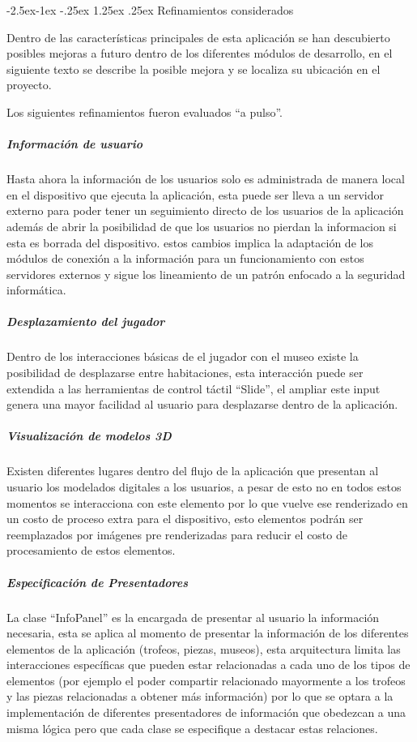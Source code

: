 \documentclass[12pt]{article}
\makeatletter
\renewcommand\paragraph{\@startsection{paragraph}{4}{\z@}%
	{-2.5ex\@plus -1ex \@minus -.25ex}%
	{1.25ex \@plus .25ex}%
	{\normalfont\normalsize\bfseries}}
\makeatother
\begin{document}
\paragraph{Refinamientos considerados}

Dentro de las características principales de esta aplicación se han descubierto posibles mejoras a futuro dentro de los diferentes módulos de desarrollo, en el siguiente  texto se describe la posible mejora y se localiza su ubicación en el proyecto.

Los siguientes refinamientos fueron evaluados “a pulso”.

\subparagraph{\textbf{Información de usuario}}
Hasta ahora la información de los usuarios solo es administrada de manera local en el dispositivo que ejecuta la aplicación, esta puede ser lleva a un servidor externo para poder tener un seguimiento directo de los usuarios de la aplicación además de abrir la posibilidad de que los usuarios no pierdan la informacion si esta es borrada del dispositivo.
estos cambios implica la adaptación de los módulos de conexión a la información para un funcionamiento con estos servidores externos y sigue los lineamiento de un patrón enfocado a la seguridad informática.

\subparagraph{\textbf{Desplazamiento del jugador}}
Dentro de los interacciones básicas de el jugador con el museo existe la posibilidad de desplazarse entre habitaciones, esta interacción puede ser extendida a las herramientas de control táctil “Slide”, el ampliar este input genera una mayor facilidad al usuario para desplazarse dentro de la aplicación.

\subparagraph{\textbf{Visualización de modelos 3D}}
Existen diferentes lugares dentro del flujo de la aplicación que presentan al usuario los modelados digitales a los usuarios, a pesar de esto no en todos estos momentos se interacciona con este elemento por lo que vuelve ese renderizado en un costo de proceso extra para el dispositivo, esto elementos podrán ser reemplazados por imágenes pre renderizadas para reducir el costo de procesamiento de estos elementos.

\subparagraph{\textbf{Especificación de Presentadores}}
La clase “InfoPanel” es la encargada de presentar  al usuario la información necesaria, esta se aplica al momento de presentar la información de los diferentes elementos de la aplicación (trofeos, piezas, museos), esta arquitectura limita las interacciones específicas que pueden estar relacionadas a cada uno de los tipos de elementos (por ejemplo el poder compartir relacionado mayormente a los trofeos y las piezas relacionadas a obtener más información) por lo que se optara a la implementación de diferentes presentadores de información que obedezcan a una misma lógica pero que cada clase se especifique a destacar estas relaciones.
\end{document}
